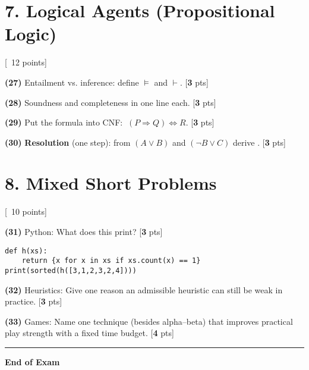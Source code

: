 \documentclass[11pt]{article}
\newif\ifincludeanswers
\newcommand{\pts}[1]{\hfill{\small[\textbf{#1} pts]}}
\begin{document}
\section*{7. Logical Agents (Propositional Logic)} \hfill {\small[~12 points]}

\noindent\textbf{(27)} Entailment vs. inference: define $\models$ and $\vdash$. \pts{3}

\noindent\textbf{(28)} Soundness and completeness in one line each. \pts{3}

\noindent\textbf{(29)} Put the formula into CNF: $\ (P \Rightarrow Q) \Leftrightarrow R$. \pts{3}

\noindent\textbf{(30)} \textbf{Resolution} (one step): from $(A \vee B)$ and $(\neg B \vee C)$ derive \underline{\hspace{2cm}}. \pts{3}

\vspace{0.6em}
\section*{8. Mixed Short Problems} \hfill {\small[~10 points]}

\noindent\textbf{(31)} Python: What does this print? \pts{3}
\begin{verbatim}
def h(xs):
    return {x for x in xs if xs.count(x) == 1}
print(sorted(h([3,1,2,3,2,4])))
\end{verbatim}

\noindent\textbf{(32)} Heuristics: Give one reason an admissible heuristic can still be weak in practice. \pts{3}

\noindent\textbf{(33)} Games: Name one technique (besides alpha–beta) that improves practical play strength with a fixed time budget. \pts{4}

\vfill
\hrule
\smallskip
\noindent\textbf{End of Exam}

\ifincludeanswers
\newpage
\end{document}

